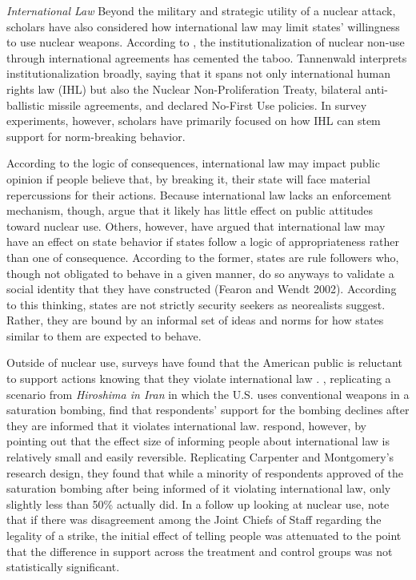 \documentclass[12pt]{article}
\begin{document}
\textit{International Law}
\noindent
Beyond the military and strategic utility of a nuclear attack, scholars have also considered how international law may limit states' willingness to use nuclear weapons. According to \citet{tannewald_nuclear_2007}, the institutionalization of nuclear non-use through international agreements has cemented the taboo. Tannenwald interprets institutionalization broadly, saying that it spans not only international human rights law (IHL) but also the Nuclear Non-Proliferation Treaty, bilateral anti-ballistic missile agreements, and declared No-First Use policies. In survey experiments, however, scholars have primarily focused on how IHL can stem support for norm-breaking behavior.

According to the logic of consequences, international law may impact public opinion if people believe that, by breaking it, their state will face material repercussions for their actions. Because international law lacks an enforcement mechanism, though, \citet{sagan_does_2020} argue that it likely has little effect on public attitudes toward nuclear use. Others, however, have argued that international law may have an effect on state behavior if states follow a logic of appropriateness rather than one of consequence. According to the former, states are rule followers who, though not obligated to behave in a given manner, do so anyways to validate a social identity that they have constructed (Fearon and Wendt 2002). According to this thinking, states are not strictly security seekers as neorealists suggest. Rather, they are bound by an informal set of ideas and norms for how states similar to them are expected to behave. 

Outside of nuclear use, surveys have found that the American public is reluctant to support actions knowing that they violate international law \citep{chilton_laws_2014, kreps_flying_2014}. \citet{carpenter_stopping_2020}, replicating a scenario from \textit{Hiroshima in Iran} in which the U.S. uses conventional weapons in a saturation bombing, find that respondents' support for the bombing declines after they are informed that it violates international law. \citet{sagan_does_2020} respond, however, by pointing out that the effect size of informing people about international law is relatively small and easily reversible. Replicating Carpenter and Montgomery's research design, they found that while a minority of respondents approved of the saturation bombing after being informed of it violating international law, only slightly less than 50\% actually did. In a follow up looking at nuclear use, \citet{sagan_atomic_2024} note that if there was disagreement among the Joint Chiefs of Staff regarding the legality of a strike, the initial effect of telling people was attenuated to the point that the difference in support across the treatment and control groups was not statistically significant.
\end{document}
